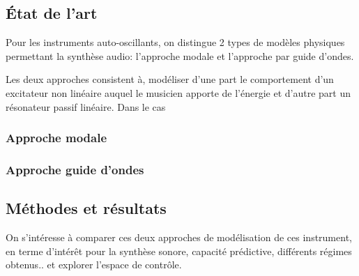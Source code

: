 \subsection{État de l'art}

Pour les instruments auto-oscillants, on distingue 2 types de modèles physiques permettant la synthèse audio: l'approche modale et l'approche par guide d'ondes.

Les deux approches consistent à, modéliser d'une part le comportement d'un excitateur non linéaire auquel le musicien apporte de l'énergie et d'autre part un résonateur passif linéaire. Dans le cas

\subsubsection{Approche modale}

\subsubsection{Approche guide d'ondes}

\subsection{Méthodes et résultats}

On s'intéresse à comparer ces deux approches de modélisation de ces instrument, en terme d'intérêt pour la synthèse sonore, capacité prédictive, différents régimes obtenus.. et explorer l'espace de contrôle. 

